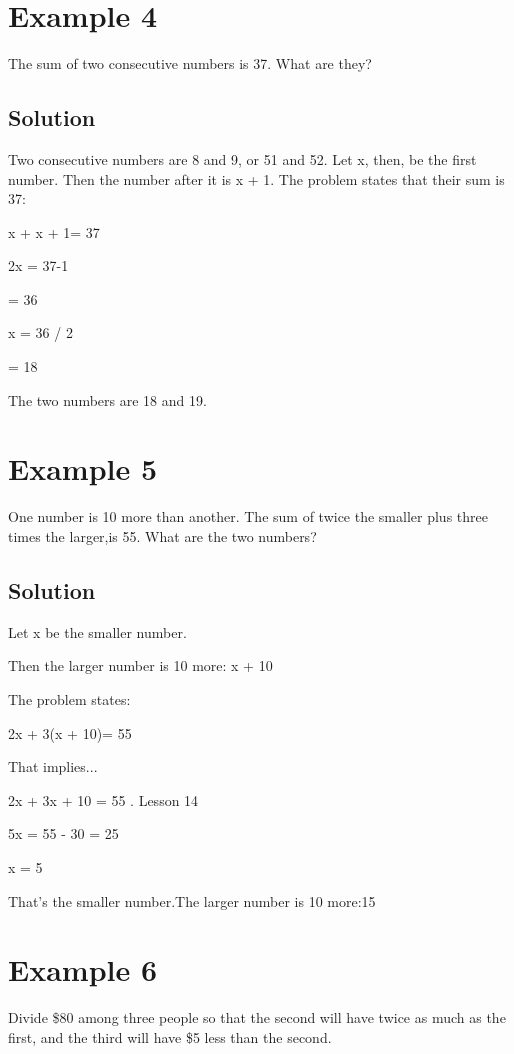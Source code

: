 \documentclass[12pt]{article}%
\begin{document}
\section{Example 4}     

The sum of two consecutive numbers is 37. What are they?

\subsection{Solution}

Two consecutive numbers are 8 and 9, or 51 and 52. Let x, then, be the first number. Then the number after it is x + 1. The problem states that their sum is 37:  

x + x + 1= 37 

2x = 37-1

= 36 

x = 36 / 2

= 18   

The two numbers are 18 and 19. 

\section{Example 5}

One number is 10 more than another. The sum of twice the smaller plus three times the larger,is 55. What are the two numbers?

\subsection{Solution}

Let x be the smaller number.

Then the larger number is 10 more: x + 10

The problem states: 

2x + 3(x + 10)= 55 

That implies...

2x + 3x + 10 = 55 . Lesson 14 

5x = 55 - 30 = 25 

x = 5 

That's the smaller number.The larger number is 10 more:15 

\section{Example 6} 

Divide \$80 among three people so that the second will have twice as much as the first, and the third will have \$5 less than the second.
\end{document}
